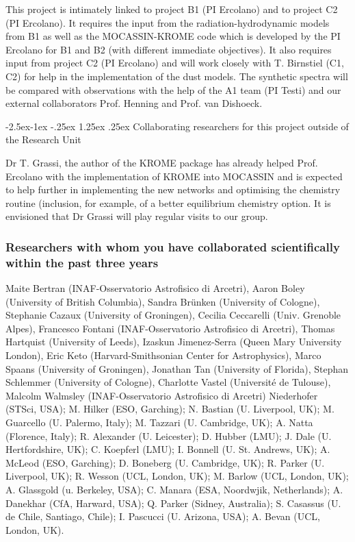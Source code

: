 \documentclass[10pt,fleqn,twoside]{article}
\makeatletter
\newcommand{\Tcol}{\color{blue}}
\renewcommand\paragraph{\@startsection{paragraph}{4}{\z@}%
            {-2.5ex\@plus -1ex \@minus -.25ex}%
            {1.25ex \@plus .25ex}%
            {\normalfont\normalsize\bfseries}}
\makeatother
\begin{document}
This project is intimately linked to project B1 (PI Ercolano) and to project C2 (PI Ercolano). 
It requires the input from the radiation-hydrodynamic models from B1 as well as the MOCASSIN-KROME code which is developed by the PI Ercolano for B1 and B2 (with different immediate objectives). It also requires input from project C2 (PI Ercolano) and will work closely with T. Birnstiel (C1, C2) for help in the implementation of the dust models. The synthetic spectra will be compared with observations with the help of the A1 team (PI Testi) and our external collaborators Prof. Henning and Prof. van Dishoeck. 

\paragraph{\Tcol Collaborating researchers for this project outside of
  the Research Unit}

Dr T. Grassi, the author of the KROME package has already helped Prof. Ercolano with the implementation of KROME into MOCASSIN and is expected to help further in implementing the new networks and optimising the chemistry routine (inclusion, for example, of a better equilibrium chemistry option. 
It is envisioned that Dr Grassi will play regular visits to our group.    

\subsubsection{\Tcol Researchers with whom you have collaborated scientifically within the past three years}

Maite Bertran (INAF-Osservatorio Astrofisico di Arcetri), Aaron Boley (University of British Columbia), Sandra Brünken (University of Cologne), Stephanie Cazaux (University of Groningen), Cecilia Ceccarelli (Univ. Grenoble Alpes), Francesco Fontani (INAF-Osservatorio Astrofisico di Arcetri), Thomas Hartquist (University of Leeds), Izaskun Jimenez-Serra (Queen Mary University London), Eric Keto (Harvard-Smithsonian Center for Astrophysics), Marco Spaans (University of Groningen), Jonathan Tan (University of Florida), Stephan Schlemmer (University of Cologne), Charlotte Vastel (Université de Tulouse), Malcolm Walmsley (INAF-Osservatorio Astrofisico di Arcetri)
 Niederhofer (STSci, USA); M. Hilker (ESO, Garching); N. Bastian (U. Liverpool,
UK); M. Guarcello (U. Palermo, Italy); M. Tazzari (U. Cambridge, UK);
A. Natta (Florence, Italy); R. Alexander (U. Leicester); D. Hubber
(LMU); J. Dale (U. Hertfordshire, UK); C. Koepferl (LMU); I. Bonnell
(U. St. Andrews, UK); A. McLeod (ESO, Garching); D. Boneberg
(U. Cambridge, UK); R. Parker (U. Liverpool, UK); R. Wesson (UCL,
London, UK); M. Barlow (UCL, London, UK); A. Glassgold (u. Berkeley,
USA); C. Manara (ESA, Noordwjik, Netherlands); A. Danekhar (CfA,
Harward, USA); Q. Parker (Sidney, Australia); S. Casassus
(U. de Chile, Santiago, Chile); I. Pascucci (U. Arizona, USA);
A. Bevan (UCL, London, UK).
\end{document}
